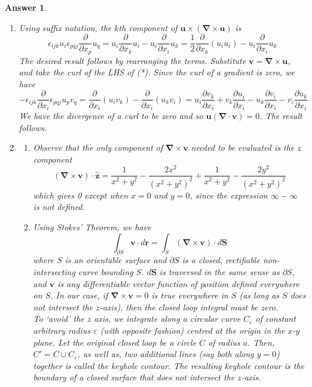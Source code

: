 \documentclass[a4paper]{article}
\newtheorem{ans}{Answer}[section]
\theoremstyle{new}
\begin{document}
\begin{ans}\leavevmode
\begin{enumerate}[label=(\alph*)]
    \item Using suffix notation, the $k$th component of $\mathbf{u}\times(\boldsymbol{\nabla}\times\mathbf{u})$ is
    \begin{equation}
\epsilon_{ijk}u_i\epsilon_{pqj}\frac{\partial}{\partial x_p}u_q=u_i\frac{\partial}{\partial x_k}u_i-u_i\frac{\partial}{\partial x_i}u_k=\frac{1}{2}\frac{\partial}{\partial x_k}(u_iu_i)-u_i\frac{\partial}{\partial x_i}u_k\tag{*}
\end{equation}
The desired result follows by rearranging the terms. Substitute $\mathbf{v}=\boldsymbol{\nabla}\times\mathbf{u}$, and take the curl of the LHS of (*). Since the curl of a gradient is zero, we have
$$-\epsilon_{ijk}\frac{\partial}{\partial x_i}\epsilon_{pqj}u_pv_q=\frac{\partial}{\partial x_i}(u_iv_k)-\frac{\partial}{\partial x_i}(u_kv_i)=u_i\frac{\partial v_k}{\partial x_i}+v_k\frac{\partial u_i}{\partial x_i}-u_k\frac{\partial v_i}{\partial x_i}-v_i\frac{\partial u_k}{\partial x_i}$$
We have the divergence of a curl to be zero and so $\mathbf{u}(\boldsymbol{\nabla}\cdot\mathbf{v})=0$. The result follows.
\item \begin{enumerate}[label=(\roman*)]
    \item  Observe that the only component of $\boldsymbol{\nabla}\times\mathbf{v}$ needed to be evaluated is the $z$ component 
$$(\boldsymbol{\nabla}\times\mathbf{v})\cdot\mathbf{\hat{z}}=\frac{1}{x^2+y^2}-\frac{2x^2}{(x^2+y^2)^2}+\frac{1}{x^2+y^2}-\frac{2y^2}{(x^2+y^2)^2}$$
which gives 0 except when $x=0$ and $y=0$, since the expression $\infty-\infty$ is not defined.
\item Using Stokes' Theorem, we have
$$\int_{\partial S}\mathbf{v}\cdot d\mathbf{r}=\int_S(\boldsymbol{\nabla}\times\mathbf{v})\cdot d\mathbf{S}$$
where $S$ is an orientable surface and $\partial S$ is a closed, rectifiable non-intersecting curve bounding $S$. $d\mathbf{S}$ is traversed in the same sense as $\partial S$, and $\mathbf{v}$ is any differentiable vector function of position defined everywhere on $S$. In our case, if $\boldsymbol{\nabla}\times\mathbf{v}=0$ is true everywhere in $S$ (as long as $S$ does not intersect the $z$-axis), then the closed loop integral must be zero.\\[5pt]
To `avoid' the $z$ axis, we integrate along a circular curve $C_\varepsilon$ of constant arbitrary radius $\varepsilon$ (with opposite fashion) centred at the origin in the $x$-$y$ plane. Let the original closed loop be a circle $C$ of radius $a$. Then, $C'=C\cup C_\varepsilon$, as well as, two additional lines (say both along $y=0$) together is called the keyhole contour. The resulting keyhole contour is the boundary of a closed surface that does not intersect the $z$-axis.
   \begin{center}
\end{center}
\end{enumerate}
\end{enumerate}
\end{ans}
\end{document}
